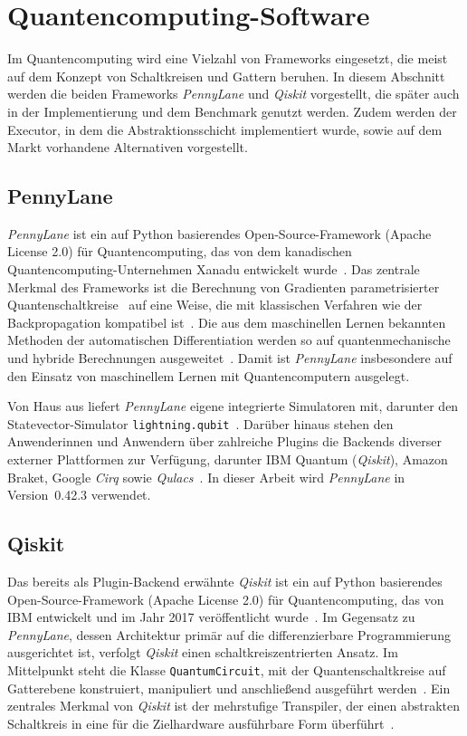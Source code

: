 \chapter{Quantencomputing-Software}
\label{chap:software}

Im Quantencomputing wird eine Vielzahl von Frameworks eingesetzt, die meist auf dem Konzept von Schaltkreisen und Gattern beruhen. In diesem Abschnitt werden die beiden Frameworks \textit{PennyLane} und \textit{Qiskit} vorgestellt, die später auch in der Implementierung und dem Benchmark genutzt werden. Zudem werden der Executor, in dem die Abstraktionsschicht implementiert wurde, sowie auf dem Markt vorhandene Alternativen vorgestellt.

\section{PennyLane}
\label{sec:pennylane}
\textit{PennyLane} ist ein auf Python basierendes Open-Source-Framework (Apache License 2.0) für Quantencomputing, das von dem kanadischen Quantencomputing-Unternehmen Xanadu entwickelt wurde~\cite{bergholm2018pennylane}. Das zentrale Merkmal des Frameworks ist die Berechnung von Gradienten parametrisierter Quantenschaltkreise~\cite{schuld2019evaluating} auf eine Weise, die mit klassischen Verfahren wie der Backpropagation kompatibel ist~\cite{baydin2018automatic}. Die aus dem maschinellen Lernen bekannten Methoden der automatischen Differentiation werden so auf quantenmechanische und hybride Berechnungen ausgeweitet~\cite{bergholm2018pennylane}. Damit ist \textit{PennyLane} insbesondere auf den Einsatz von maschinellem Lernen mit Quantencomputern ausgelegt.

Von Haus aus liefert \textit{PennyLane} eigene integrierte Simulatoren mit, darunter den Statevector-Simulator \texttt{lightning.qubit}~\cite{bergholm2018pennylane}. Darüber hinaus stehen den Anwenderinnen und Anwendern über zahlreiche Plugins die Backends diverser externer Plattformen zur Verfügung, darunter IBM Quantum (\textit{Qiskit}), Amazon Braket, Google \textit{Cirq} sowie \textit{Qulacs}~\cite{bergholm2018pennylane}. In dieser Arbeit wird \textit{PennyLane} in Version~0.42.3 verwendet.

\newpage
\section{Qiskit}
\label{sec:qiskit}
Das bereits als Plugin-Backend erwähnte \textit{Qiskit} ist ein auf Python basierendes Open-Source-Framework (Apache License 2.0) für Quantencomputing, das von IBM entwickelt und im Jahr 2017 veröffentlicht wurde~\cite{javadiabhari2024quantum}. Im Gegensatz zu \textit{PennyLane}, dessen Architektur primär auf die differenzierbare Programmierung ausgerichtet ist, verfolgt \textit{Qiskit} einen schaltkreiszentrierten Ansatz. Im Mittelpunkt steht die Klasse \texttt{QuantumCircuit}, mit der Quantenschaltkreise auf Gatterebene konstruiert, manipuliert und anschließend ausgeführt werden~\cite{javadiabhari2024quantum}. Ein zentrales Merkmal von \textit{Qiskit} ist der mehrstufige Transpiler, der einen abstrakten Schaltkreis in eine für die Zielhardware ausführbare Form überführt~\cite{javadiabhari2024quantum}.


